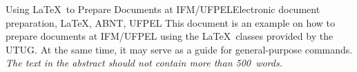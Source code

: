 \begin{abstract}
Este documento é um exemplo de como formatar documentos para o
Instituto de Física e Matemática da UFPEL usando as classes \LaTeX\@. Ao mesmo tempo, pode servir de consulta
para comandos mais genéricos. \emph{O texto do resumo não deve
conter mais do que 500 palavras.}
\end{abstract}

\begin{englishabstract}{Using \LaTeX\ to Prepare Documents at IFM/UFPEL}{Electronic document preparation, \LaTeX, ABNT, UFPEL}
This document is an example on how to prepare documents at IFM/UFPEL
using the \LaTeX\ classes provided by the UTUG\@. At the same time, it
may serve as a guide for general-purpose commands. \emph{The text in
the abstract should not contain more than 500~words.}
\end{englishabstract}
